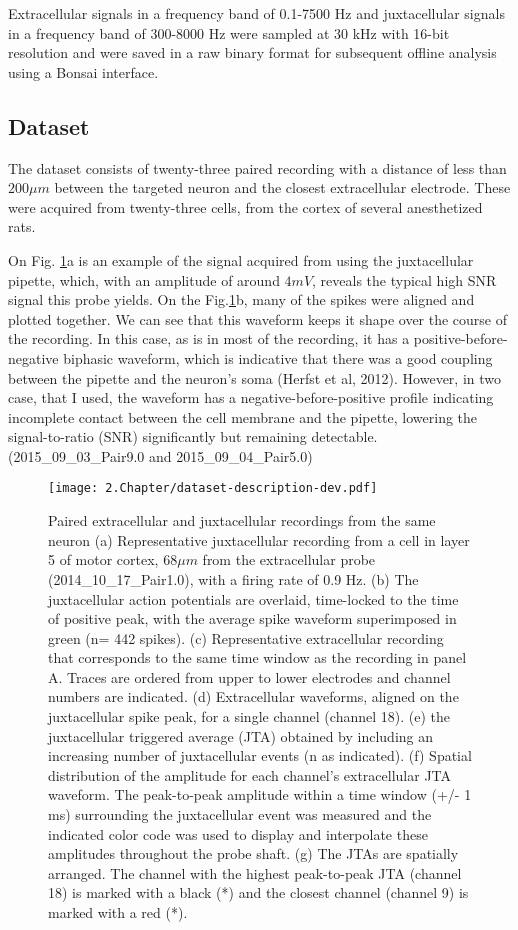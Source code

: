 Extracellular signals in a frequency band of 0.1-7500 Hz and juxtacellular signals in a frequency band of 300-8000 Hz were sampled at 30 kHz with 16-bit resolution and were saved in a raw binary format for subsequent offline analysis using a Bonsai interface. \cite{bonsai2015}


\subsection{Dataset}
\label{subsec:Netodataset}
The dataset consists of twenty-three paired recording with a distance of less than $200 \mu m$ between the targeted neuron and the closest extracellular electrode. These were acquired from twenty-three cells, from the cortex of several anesthetized rats.

On Fig. \ref{fig:neto-data-description}a is an example of the signal acquired from using the juxtacellular pipette, which, with an amplitude of around $4mV$, reveals the typical high SNR signal this probe yields. On the Fig.\ref{fig:neto-data-description}b, many of the spikes were aligned and plotted together. We can see that this waveform keeps it shape over the course of the recording. In this case, as is in most of the recording, it has a positive-before-negative biphasic waveform, which is indicative that there was a good coupling between the pipette and the neuron's soma (Herfst et al, 2012). However, in two case, that I used, the waveform has a negative-before-positive profile indicating incomplete contact between the cell membrane and the pipette, lowering the signal-to-ratio (SNR) significantly but remaining detectable. (2015\_09\_03\_Pair9.0 and 2015\_09\_04\_Pair5.0)

\begin{figure}[!h]
	\centering
	\texttt{[image: 2.Chapter/dataset-description-dev.pdf]}
	\caption{Paired extracellular and juxtacellular recordings from the same neuron
(a) Representative juxtacellular recording from a cell in layer 5 of motor cortex, $68 \mu m$ from the extracellular probe (2014\_10\_17\_Pair1.0), with a firing rate of 0.9 Hz. (b) The juxtacellular action potentials are overlaid, time-locked to the time of positive peak, with the average spike waveform superimposed in green (n= 442 spikes). (c) Representative extracellular recording that corresponds to the same time window as the recording in panel A. Traces are ordered from upper to lower electrodes and channel numbers are indicated. (d) Extracellular waveforms, aligned on the juxtacellular spike peak, for a single channel (channel 18). (e) the juxtacellular triggered average (JTA) obtained by including an increasing number of juxtacellular events (n as indicated). (f) Spatial distribution of the amplitude for each channel’s extracellular JTA waveform. The peak-to-peak amplitude within a time window (+/- 1 ms) surrounding the juxtacellular event was measured and the indicated color code was used to display and interpolate these amplitudes throughout the probe shaft. (g) The JTAs are spatially arranged. The channel with the highest peak-to-peak JTA (channel 18) is marked with a black (*) and the closest channel (channel 9) is marked with a red (*).
}
\label{fig:neto-data-description}
\end{figure}

